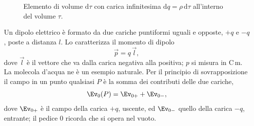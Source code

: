 \documentclass[main.tex]{subfiles}
\begin{document}
\begin{figure}[htbp]
  \caption{Elemento di volume $\mathrm{d}\tau$ con carica infinitesima $\mathrm{d}q = \rho\,\mathrm{d}\tau$ all'interno del volume $\tau$.}
  \label{fig:campo:distribuzione_volumetrica_infografica}
\end{figure}

Un dipolo elettrico è formato da due cariche puntiformi uguali e opposte, $+q$ e $-q$, poste a distanza $l$. Lo caratterizza il momento di dipolo
\[
\vec p=q\,\vec l ,
\]
dove $\vec l$ è il vettore che va dalla carica negativa alla positiva; $p$ si misura in $\mathrm{C\,m}$. La molecola d'acqua ne è un esempio naturale. Per il principio di sovrapposizione il campo in un punto qualsiasi $P$ è la somma dei contributi delle due cariche,
\[
\Ev_0(P)=\Ev_{0+}+\Ev_{0-},
\]
dove $\Ev_{0+}$ è il campo della carica $+q$, uscente, ed $\Ev_{0-}$ quello della carica $-q$, entrante; il pedice $0$ ricorda che si opera nel vuoto.
\end{document}

